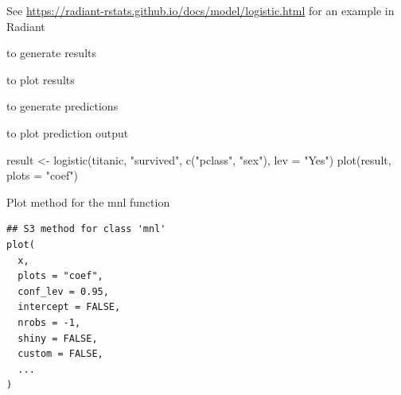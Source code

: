 \documentclass[a4paper]{book}
\begin{document}
%
\begin{Details}
See \url{https://radiant-rstats.github.io/docs/model/logistic.html} for an example in Radiant
\end{Details}
%
\begin{SeeAlso}
 to generate results

 to plot results

 to generate predictions

 to plot prediction output
\end{SeeAlso}
%
\begin{Examples}
\begin{ExampleCode}
result <- logistic(titanic, "survived", c("pclass", "sex"), lev = "Yes")
plot(result, plots = "coef")
\end{ExampleCode}
\end{Examples}
%
\begin{Description}
Plot method for the mnl function
\end{Description}
%
\begin{Usage}
\begin{verbatim}
## S3 method for class 'mnl'
plot(
  x,
  plots = "coef",
  conf_lev = 0.95,
  intercept = FALSE,
  nrobs = -1,
  shiny = FALSE,
  custom = FALSE,
  ...
)
\end{verbatim}
\end{Usage}
%
\end{document}
